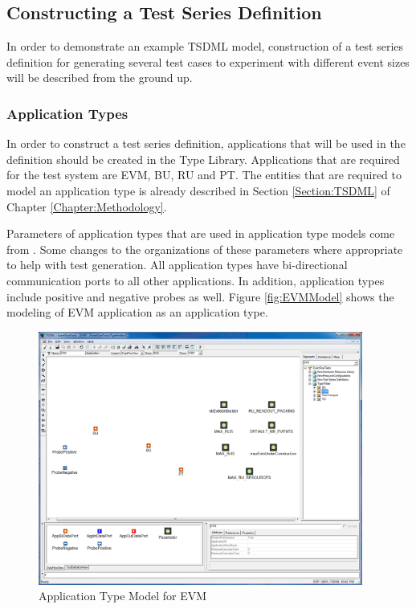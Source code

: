 \subsection{Constructing a Test Series Definition}
In order to demonstrate an example TSDML model, construction of a test series definition for generating several test cases to experiment with different event sizes will be described from the ground up. 

\subsubsection{Application Types}
In order to construct a test series definition, applications that will be used in the definition should be created in the Type Library. Applications that are required for the test system are EVM, BU, RU and PT. The entities that are required to model an application type is already described in Section \ref{Section:TSDML} of Chapter \ref{Chapter:Methodology}.

Parameters of application types that are used in application type models come from \cite{rubuilder}. Some changes to the organizations of these parameters where appropriate to help with test generation. All application types have bi-directional communication ports to all other applications. In addition, application types include positive and negative probes as well. Figure \ref{fig:EVMModel} shows the modeling of EVM application as an application type.

\begin{figure}
	\centering
		\includegraphics[width=0.95\textwidth]{figures/EVM_tsdml.png}
	\caption{Application Type Model for EVM}
	\label{fig:EVM_tsdml}
\end{figure}

